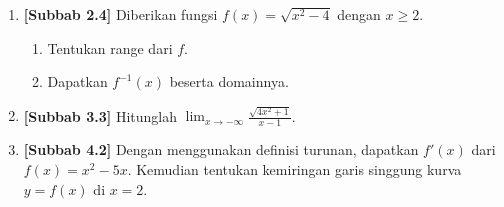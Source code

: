\documentclass[10pt,openany,a4paper]{article}
\theoremstyle{definition}
\theoremstyle{definition}
\theoremstyle{plain}
\begin{document}
\begin{enumerate}
    \item \textbf{[Subbab 2.4]} Diberikan fungsi $f(x)=\sqrt{x^2-4}$ dengan $x\geq 2$.
    \begin{enumerate}
        \item Tentukan range dari $f$.
        \item Dapatkan $f^{-1}(x)$ beserta domainnya.
    \end{enumerate}

    \item \textbf{[Subbab 3.3]} Hitunglah $\displaystyle\lim_{x\to-\infty}\frac{\sqrt{4x^2+1}}{x-1}$.

    \item \textbf{[Subbab 4.2]} Dengan menggunakan definisi turunan, dapatkan $f'(x)$ dari $f(x)=x^2-5x$. Kemudian tentukan kemiringan garis singgung kurva $y=f(x)$ di $x=2$.
\end{enumerate}

\newpage
\end{document}
